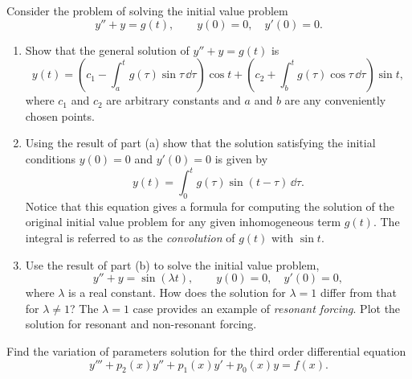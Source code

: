 {%
\begin{Exercise}
  \label{exercise resonant non-resonant forcing}
  Consider the problem of solving the initial value problem
  \[
  y'' + y = g(t), \qquad y(0) = 0, \quad y'(0) = 0.
  \]
  \begin{enumerate}
  \item
    Show that the general solution of $y'' + y = g(t)$ is
    \[
    y(t) = 
    \left( c_1 - \int_a^t g(\tau) \sin \tau \,\dd \tau \right) \cos t
    + \left( c_2 + \int_b^t g(\tau) \cos \tau \,\dd \tau \right) \sin t,
    \]
    where $c_1$ and $c_2$ are arbitrary constants and $a$ and $b$
    are any conveniently chosen points.
  \item
    Using the result of part (a) show that the solution satisfying the initial
    conditions $y(0) = 0$ and $y'(0) = 0$ is given by
    \[
    y(t) = \int_0^t g(\tau) \sin(t-\tau) \,\dd \tau.
    \]
    Notice that this equation gives a formula for computing the solution of
    the original initial value problem for any given inhomogeneous term $g(t)$.
    The integral is referred to as the \textit{convolution} of $g(t)$
    with $\sin t$.
  \item
    Use the result of part (b) to solve the initial value problem,
    \[
    y'' + y = \sin( \lambda t ), \qquad y(0) = 0, \quad y'(0) = 0,
    \]
    where $\lambda$ is a real constant.  How does the solution for $\lambda = 1$
    differ from that for $\lambda \neq 1$?  The $\lambda = 1$ case provides an 
    example of \textit{resonant forcing}.  Plot the solution for resonant and
    non-resonant forcing.
  \end{enumerate}

\end{Exercise}









\begin{Exercise}
  \label{exercise y+p2y+p1y+p0y=f}
  Find the variation of parameters solution for the third order differential
  equation
  \[ 
  y''' + p_2(x) y'' + p_1(x) y' + p_0(x) y = f(x). 
  \]

\end{Exercise}



}
